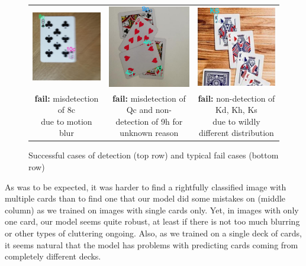 \documentclass[a4paper]{article}
\begin{document}
\begin{figure}[h]
\begin{tabular}{ccc}
  \includegraphics[width=44mm]{fail1} &   \includegraphics[width=44mm]{fail2} &   \includegraphics[width=44mm]{fail3}\\
\makecell{\textbf{fail:}  misdetection of 8c \\ due to motion blur} & \makecell{\textbf{fail:} misdetection of Qc and non- \\detection of 9h for unknown reason} & \makecell{\textbf{fail:} non-detection of Kd, Kh, Ks \\ due to wildly different distribution} \\[6pt]



\end{tabular}
\caption{Successful cases of detection (top row) and typical fail cases (bottom row) }
\end{figure}
As was to be expected, it was harder to find a rightfully classified image with multiple cards than to find one that our model did some mistakes on (middle column) as we trained on images with single cards only. Yet, in images with only one card, our model seems quite robust, at least if there is not too much blurring or other types of cluttering ongoing. Also, as we trained on a single deck of cards, it seems natural that the model has problems with predicting cards coming from completely different decks.
\end{document}
